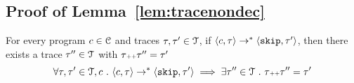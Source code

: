   \subsection{Proof of Lemma~\ref{lem:tracenondec}}
  \label{apdx:tracenondec}
  \begin{lemma}
    For every program $c \in \mathcal{C}$ and traces $\mathtt{\tau}, \mathtt{\tau}' \in \mathcal{T}$, if 
    $\langle c, \mathtt{\tau} \rangle \rightarrow^{*} \langle \mathtt{skip}, \mathtt{\tau}' \rangle$,
    then there exists a trace $\mathtt{\tau}'' \in \mathcal{T}$ with $\mathtt{\tau} {\scriptscriptstyle ++} \mathtt{\tau}'' = \mathtt{\tau}'$
    $$
    \forall \mathtt{\tau}, \mathtt{\tau}' \in \mathcal{T}, c ~.~
    \langle c, \mathtt{\tau} \rangle \rightarrow^{*} \langle \mathtt{skip}, \mathtt{\tau}' \rangle 
    \implies \exists \mathtt{\tau}'' \in \mathcal{T} ~.~ \mathtt{\tau} {\scriptscriptstyle ++} \mathtt{\tau}'' = \mathtt{\tau}'
    $$
    \end{lemma}
